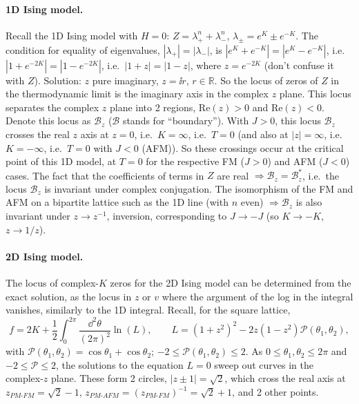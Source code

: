 \paragraph{1D Ising model.} Recall the 1D Ising model with $H = 0$: $Z = \lambda_+^n+\lambda_-^n$,
$\lambda_\pm = e^K\pm e^{-K}$. The condition for equality of eigenvalues, $|\lambda_+| = |\lambda_-|$, is
$|e^K+e^{-K}| = |e^K-e^{-K}|$, i.e.\ $|1+e^{-2K}| = |1-e^{-2K}|$, i.e.\ $|1+z| = |1-z|$, where $z = e^{-2K}$
(don't confuse it with $Z$). Solution: $z$ pure imaginary, $z = \ii r$, $r\in\mathbb R$. So the locus of zeros of
$Z$ in the thermodynamic limit is the imaginary axis in the complex $z$ plane. This locus separates the complex $z$
plane into 2 regions, $\mathrm{Re}(z)>0$ and $\mathrm{Re}(z)<0$. Denote this locus as $\mathcal B_z$ ($\mathcal B$
stands for ``boundary''). With $J>0$, this locus $\mathcal B_z$ crosses the real $z$ axis at $z = 0$, i.e.\
$K = \infty$, i.e.\ $T = 0$ (and also at $|z| = \infty$, i.e.\ $K = -\infty$, i.e.\ $T = 0$ with $J<0$ (AFM)). So
these crossings occur at the critical point of this 1D model, at $T = 0$ for the respective FM ($J>0$) and AFM
($J<0$) cases. The fact that the coefficients of terms in $Z$ are real $\Rightarrow\mathcal B_z = \mathcal B_z^*$,
i.e.\ the locus $\mathcal B_z$ is invariant under complex conjugation. The isomorphism of the FM and AFM on a
bipartite lattice such as the 1D line (with $n$ even) $\Rightarrow\mathcal B_z$ is also invariant under
$z\to z^{-1}$, inversion, corresponding to $J\to-J$ (so $K\to-K$, $z\to1/z$).

\paragraph{2D Ising model.} The locus of complex-$K$ zeros for the 2D Ising model can be determined from the exact
solution, as the locus in $z$ or $v$ where the argument of the log in the integral vanishes, similarly to the 1D
integral. Recall, for the square lattice,
\begin{equation}
  f = 2K + \frac{1}{2}\int_0^{2\pi}\frac{\dd^2\theta}{(2\pi)^2}\ln(L),\qquad
  L = (1+z^2)^2 - 2z(1-z^2)\mathcal P(\theta_1,\theta_2),
\end{equation}
with $\mathcal P(\theta_1,\theta_2) = \cos\theta_1+\cos\theta_2$; $-2\le\mathcal P(\theta_1,\theta_2)\le 2$. As
$0\le\theta_1,\theta_2\le 2\pi$ and $-2\le\mathcal P\le 2$, the solutions to the equation $L = 0$ sweep out curves in
the complex-$z$ plane. These form 2 circles, $|z\pm1| = \sqrt2$, which cross the real axis at
$z_{PM\text{-}FM} = \sqrt2-1$, $z_{PM\text{-}AFM} = (z_{PM\text{-}FM})^{-1} = \sqrt2+1$, and 2 other points.

